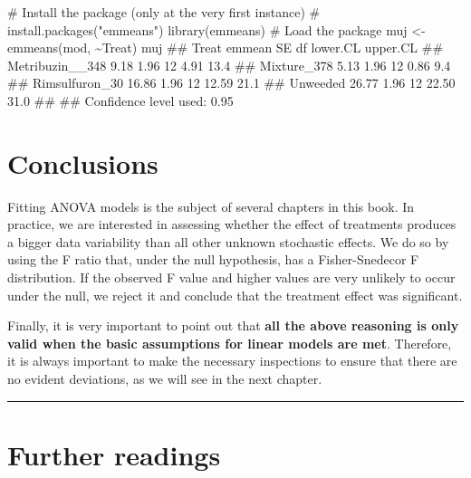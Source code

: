 \documentclass[a4paper,12pt,oneside]{book}
\newenvironment{Shaded}{\begin{snugshade}}{\end{snugshade}}
\newcommand{\SpecialCharTok}[1]{#1}
\newcommand{\CommentTok}[1]{#1}
\newcommand{\DocumentationTok}[1]{#1}
\newcommand{\OtherTok}[1]{#1}
\newcommand{\FunctionTok}[1]{#1}
\newcommand{\NormalTok}[1]{#1}
\begin{document}
\begin{Shaded}
\begin{Highlighting}[]
\CommentTok{\# Install the package (only at the very first instance)}
\CommentTok{\# install.packages("emmeans") }
\FunctionTok{library}\NormalTok{(emmeans) }\CommentTok{\# Load the package}
\NormalTok{muj }\OtherTok{\textless{}{-}} \FunctionTok{emmeans}\NormalTok{(mod, }\SpecialCharTok{\textasciitilde{}}\NormalTok{Treat)}
\NormalTok{muj}
\DocumentationTok{\#\#  Treat           emmean   SE df lower.CL upper.CL}
\DocumentationTok{\#\#  Metribuzin\_\_348   9.18 1.96 12     4.91     13.4}
\DocumentationTok{\#\#  Mixture\_378       5.13 1.96 12     0.86      9.4}
\DocumentationTok{\#\#  Rimsulfuron\_30   16.86 1.96 12    12.59     21.1}
\DocumentationTok{\#\#  Unweeded         26.77 1.96 12    22.50     31.0}
\DocumentationTok{\#\# }
\DocumentationTok{\#\# Confidence level used: 0.95}
\end{Highlighting}
\end{Shaded}

\hypertarget{conclusions-4}{%
\section{Conclusions}\label{conclusions-4}}

Fitting ANOVA models is the subject of several chapters in this book. In practice, we are interested in assessing whether the effect of treatments produces a bigger data variability than all other unknown stochastic effects. We do so by using the F ratio that, under the null hypothesis, has a Fisher-Snedecor F distribution. If the observed F value and higher values are very unlikely to occur under the null, we reject it and conclude that the treatment effect was significant.

Finally, it is very important to point out that \textbf{all the above reasoning is only valid when the basic assumptions for linear models are met}. Therefore, it is always important to make the necessary inspections to ensure that there are no evident deviations, as we will see in the next chapter.

\begin{center}\rule{0.5\linewidth}{0.5pt}\end{center}

\hypertarget{further-readings-5}{%
\section{Further readings}\label{further-readings-5}}
\end{document}
